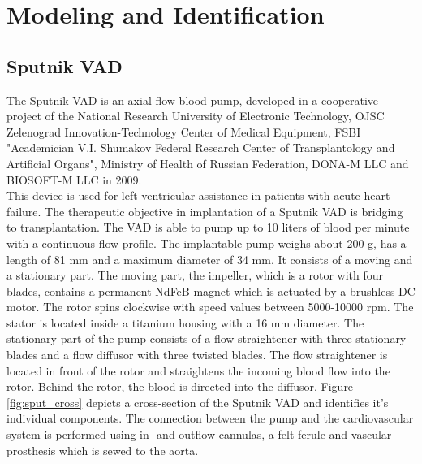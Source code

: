 \chapter{Modeling and Identification}
\section{Sputnik VAD}
The Sputnik VAD is an axial-flow blood pump, developed in a cooperative project of the National Research University of Electronic Technology, OJSC Zelenograd Innovation-Technology Center of Medical Equipment, FSBI "Academician V.I. Shumakov Federal Research Center of Transplantology and Artificial Organs", Ministry of Health of Russian Federation, DONA-M LLC and BIOSOFT-M LLC in 2009. \cite{Sputnik1}
\\This device is used for left ventricular assistance in patients with acute heart failure. The therapeutic objective in implantation of a Sputnik VAD is bridging to transplantation. The VAD is able to pump up to 10 liters of blood per minute with a continuous flow profile. The implantable pump weighs about 200 g, has a length of 81 mm and a maximum diameter of 34 mm. It consists of a moving and a stationary part. The moving part, the impeller, which is a rotor with four blades, contains a permanent NdFeB-magnet which is actuated by a brushless DC motor. The rotor spins clockwise with speed values between 5000-10000 rpm. The stator is located inside a titanium housing with a 16 mm diameter. The stationary part of the pump consists of a flow straightener with three stationary blades and a flow diffusor with three twisted blades. The flow straightener is located in front of the rotor and straightens the incoming blood flow into the rotor. Behind the rotor, the blood is directed into the diffusor. %
Figure \ref{fig:sput_cross} depicts a cross-section of the Sputnik VAD and identifies it's individual components.
The connection between the pump and the cardiovascular system is performed using in- and outflow cannulas, a felt ferule and vascular prosthesis which is sewed to the aorta. \cite{Sputnik1}

